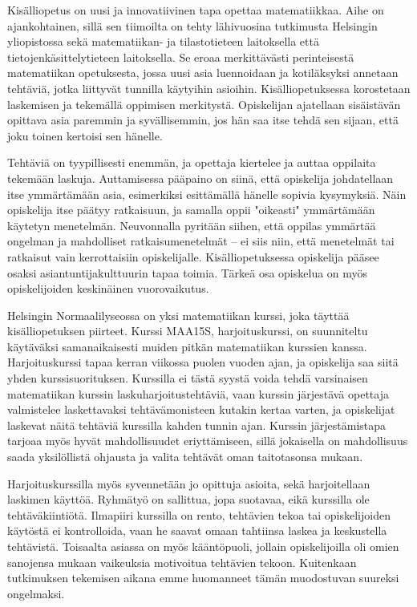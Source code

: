 Kisälliopetus on uusi ja innovatiivinen tapa opettaa matematiikkaa. Aihe on ajankohtainen, sillä sen tiimoilta on tehty lähivuosina tutkimusta Helsingin yliopistossa sekä matematiikan- ja tilastotieteen laitoksella että tietojenkäsittelytieteen laitoksella.
Se eroaa merkittävästi perinteisestä matematiikan opetuksesta, jossa uusi asia luennoidaan ja kotiläksyksi annetaan tehtäviä, jotka liittyvät tunnilla käytyihin asioihin.
Kisälliopetuksessa korostetaan laskemisen ja tekemällä oppimisen merkitystä. Opiskelijan ajatellaan sisäistävän opittava asia paremmin ja syvällisemmin, jos hän saa itse tehdä sen sijaan, että joku toinen kertoisi sen hänelle.

Tehtäviä on tyypillisesti enemmän, ja opettaja kiertelee ja auttaa oppilaita tekemään laskuja. Auttamisessa pääpaino on siinä, että opiskelija johdatellaan itse ymmärtämään asia, esimerkiksi esittämällä hänelle sopivia kysymyksiä. Näin opiskelija itse päätyy ratkaisuun, ja samalla oppii "oikeasti" ymmärtämään käytetyn menetelmän.
Neuvonnalla pyritään siihen, että oppilas ymmärtää ongelman ja mahdolliset ratkaisumenetelmät -- ei siis niin, että menetelmät tai ratkaisut vain kerrottaisiin opiskelijalle.
Kisälli\-opetuksessa opiskelija pääsee osaksi asiantuntijakulttuurin tapaa toimia.\cite{hautala2012extreme,vihavainen2011extreme}
Tärkeä osa opiskelua on myös opiskelijoiden keskinäinen vuorovaikutus. 

Helsingin Normaalilyseossa on yksi matematiikan kurssi, joka täyttää kisälli\-opetuksen piirteet.
Kurssi MAA15S, harjoituskurssi, on suunniteltu käytäväksi samanaikaisesti muiden pitkän matematiikan kurssien kanssa. 
Harjoituskurssi tapaa kerran viikossa puolen vuoden ajan, ja opiskelija saa siitä yhden kurssisuorituksen.
Kurssilla ei tästä syystä voida tehdä varsinaisen matematiikan kurssin laskuharjoitustehtäviä, vaan kurssin järjestävä opettaja valmistelee laskettavaksi tehtävämonisteen kutakin kertaa varten, ja opiskelijat laskevat näitä tehtäviä kurssilla kahden tunnin ajan.
Kurssin järjestämistapa tarjoaa myös hyvät mahdollisuudet eriyttämiseen, sillä jokaisella on mahdollisuus saada yksilöllistä ohjausta ja valita tehtävät oman taitotasonsa mukaan.

Harjoituskurssilla myös syvennetään jo opittuja asioita, sekä harjoitellaan laskimen käyttöä.
Ryhmätyö on sallittua, jopa suotavaa, eikä kurssilla ole tehtäväkiintiötä. 
Ilmapiiri kurssilla on rento, tehtävien tekoa tai opiskelijoiden käytöstä ei kontrolloida, vaan he saavat omaan tahtiinsa laskea ja keskustella tehtävistä.
Toisaalta asiassa on myös kääntöpuoli, jollain opiskelijoilla oli omien sanojensa mukaan vaikeuksia motivoitua tehtävien tekoon. Kuitenkaan tutkimuksen tekemisen aikana emme huomanneet tämän muodostuvan suureksi ongelmaksi.
